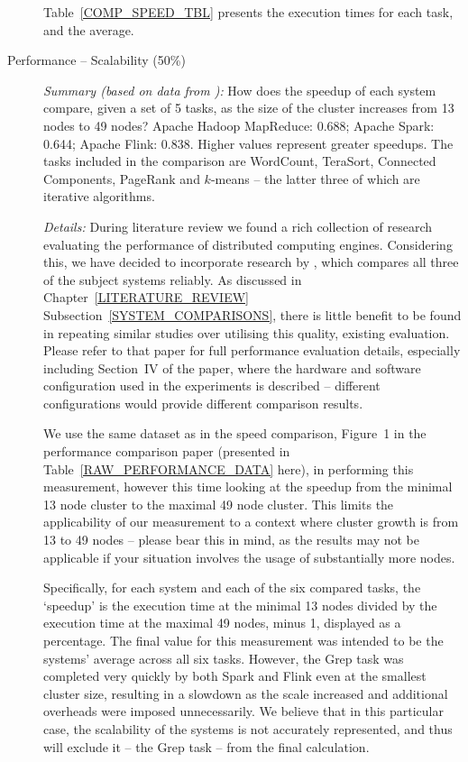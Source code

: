 \begin{description}
      Table~\ref{COMP_SPEED_TBL} presents the execution times for each task, and the average.

    \item[Performance -- Scalability (50\%)]
      \textit{Summary (based on data from \citeauthor{VEIGA:EVALUATION:2015} \cite{VEIGA:EVALUATION:2015}):} How does the speedup of each system compare, given a set of 5 tasks, as the size of the cluster increases from 13 nodes to 49 nodes? Apache Hadoop MapReduce: 0.688; Apache Spark: 0.644; Apache Flink: 0.838. Higher values represent greater speedups. The tasks included in the comparison are WordCount, TeraSort, Connected Components, PageRank and $k$-means -- the latter three of which are iterative algorithms. \medskip

      \textit{Details:} During literature review we found a rich collection of research evaluating the performance of distributed computing engines. Considering this, we have decided to incorporate research by \citeauthor{VEIGA:EVALUATION:2015} \cite{VEIGA:EVALUATION:2015}, which compares all three of the subject systems reliably. As discussed in Chapter~\ref{LITERATURE_REVIEW} Subsection~\ref{SYSTEM_COMPARISONS}, there is little benefit to be found in repeating similar studies over utilising this quality, existing evaluation. Please refer to that paper for full performance evaluation details, especially including Section~IV of the paper, where the hardware and software configuration used in the experiments is described -- different configurations would provide different comparison results.
      
      We use the same dataset as in the speed comparison, Figure~1 in the performance comparison paper (presented in Table~\ref{RAW_PERFORMANCE_DATA} here), in performing this measurement, however this time looking at the speedup from the minimal 13 node cluster to the maximal 49 node cluster. This limits the applicability of our measurement to a context where cluster growth is from 13 to 49 nodes -- please bear this in mind, as the results may not be applicable if your situation involves the usage of substantially more nodes.

      Specifically, for each system and each of the six compared tasks, the `speedup' is the execution time at the minimal 13 nodes divided by the execution time at the maximal 49 nodes, minus 1, displayed as a percentage. The final value for this measurement was intended to be the systems' average across all six tasks. However, the Grep task was completed very quickly by both Spark and Flink even at the smallest cluster size, resulting in a slowdown as the scale increased and additional overheads were imposed unnecessarily. We believe that in this particular case, the scalability of the systems is not accurately represented, and thus will exclude it -- the Grep task -- from the final calculation.


\end{description}
